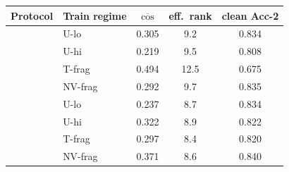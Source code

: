
\begin{tabular}{llccc}
\toprule
Protocol & Train regime & $\overline{\cos}$ & eff.\ rank & clean Acc-2 \\
\midrule
\tokenlevel{} & U-lo & 0.305 & 9.2 & 0.834 \\
 & U-hi & 0.219 & 9.5 & 0.808 \\
 & T-frag & 0.494 & 12.5 & 0.675 \\
 & NV-frag & 0.292 & 9.7 & 0.835 \\
\addlinespace
\modlevel{} & U-lo & 0.237 & 8.7 & 0.834 \\
 & U-hi & 0.322 & 8.9 & 0.822 \\
 & T-frag & 0.297 & 8.4 & 0.820 \\
 & NV-frag & 0.371 & 8.6 & 0.840 \\
\bottomrule
\end{tabular}
